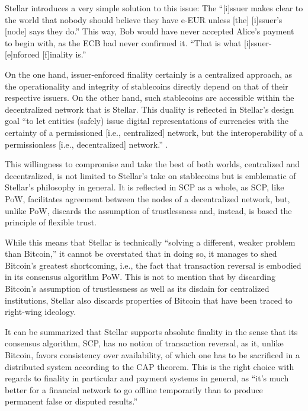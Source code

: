 Stellar introduces a very simple solution to this issue:
The ``[i]ssuer makes clear to the world that nobody should believe they have e-EUR unless [the] [i]ssuer's [node] says they do.'' 
This way, Bob would have never accepted Alice's payment to begin with, as the ECB had never confirmed it.
``That is what [i]ssuer-[e]nforced [f]inality is.''

On the one hand, issuer-enforced finality certainly is a centralized approach, as the operationality and integrity of stablecoins directly depend on that of their respective issuers.
On the other hand, such stablecoins are accessible within the decentralized network that is Stellar.
This duality is reflected in Stellar's design goal ``to let entities (safely) issue digital representations of currencies with the certainty of a permissioned [i.e., centralized] network, but the interoperability of a permissionless [i.e., decentralized] network.'' \autocite{stellar2020ief}.

This willingness to compromise and take the best of both worlds, centralized and decentralized, is not limited to Stellar's take on stablecoins but is emblematic of Stellar's philosophy in general.
It is reflected in SCP as a whole, as SCP, like PoW, facilitates agreement between the nodes of a decentralized network, but, unlike PoW, discards the assumption of trustlessness and, instead, is based the principle of flexible trust.

While this means that Stellar is technically ``solving a different, weaker problem than Bitcoin,'' \autocite{hackernoon2018ccfinality} it cannot be overstated that in doing so, it manages to shed Bitcoin's greatest shortcoming, i.e., the fact that transaction reversal is embodied in its consensus algorithm PoW.
This is not to mention that by discarding Bitcoin's assumption of trustlessness as well as its disdain for centralized institutions, Stellar also discards properties of Bitcoin that have been traced to right-wing ideology.

It can be summarized that Stellar supports absolute finality in the sense that its consensus algorithm, SCP, has no notion of transaction reversal, as it, unlike Bitcoin, favors consistency over availability, of which one has to be sacrificed in a distributed system according to the CAP theorem.
This is the right choice with regards to finality in particular and payment systems in general, as ``it’s much better for a financial network to go offline temporarily than to produce permanent false or disputed results.'' \autocite{stellar2019networkhalt}

